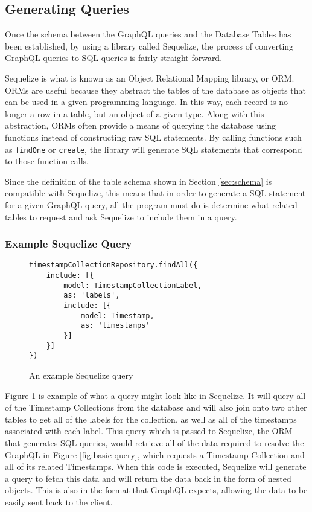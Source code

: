 \subsection{Generating Queries}

Once the schema between the GraphQL queries and the Database Tables has been established, by using a library called Sequelize, the process of converting GraphQL queries to SQL queries is fairly straight forward.

Sequelize is what is known as an Object Relational Mapping library, or ORM.  ORMs are useful because they abstract the tables of the database as objects that can be used in a given programming language.  In this way, each record is no longer a row in a table, but an object of a given type.  Along with this abstraction, ORMs often provide a means of querying the database using functions instead of constructing raw SQL statements.  By calling functions such as \Verb!findOne! or \Verb!create!, the library will generate SQL statements that correspond to those function calls.

Since the definition of the table schema shown in Section \ref{sec:schema} is compatible with Sequelize, this means that in order to generate a SQL statement for a given GraphQL query, all the program must do is determine what related tables to request and ask Sequelize to include them in a query.

\subsubsection{Example Sequelize Query}

\begin{figure}
    \begin{verbatim}
timestampCollectionRepository.findAll({
    include: [{
        model: TimestampCollectionLabel,
        as: 'labels',
        include: [{
            model: Timestamp,
            as: 'timestamps'
        }]
    }]
})
    \end{verbatim}
    \caption{An example Sequelize query}
    \label{fig:sequelize-query}
\end{figure}

Figure \ref{fig:sequelize-query} is example of what a query might look like in Sequelize.  It will query all of the Timestamp Collections from the database and will also join onto two other tables to get all of the labels for the collection, as well as all of the timestamps associated with each label.  This query which is passed to Sequelize, the ORM that generates SQL queries, would retrieve all of the data required to resolve the GraphQL in Figure \ref{fig:basic-query}, which requests a Timestamp Collection and all of its related Timestamps.  When this code is executed, Sequelize will generate a query to fetch this data and will return the data back in the form of nested objects.  This is also in the format that GraphQL expects, allowing the data to be easily sent back to the client.

